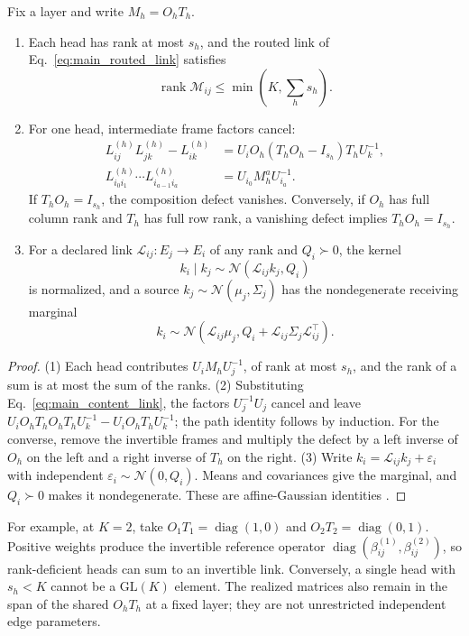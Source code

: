 \documentclass[twoside,11pt]{article}
\begin{document}
\begin{proposition}
\label{prop:link_algebra}
Fix a layer and write $M_h=O_hT_h$.
\begin{enumerate}
\item Each head has rank at most $s_h$, and the routed link of Eq.~\eqref{eq:main_routed_link} satisfies
\begin{equation}
\operatorname{rank}\mathcal M_{ij}
\le\min\left(K,\sum_hs_h\right).
\label{eq:main_link_rank}
\end{equation}
\item For one head, intermediate frame factors cancel:
\begin{align}
L_{ij}^{(h)}L_{jk}^{(h)}-L_{ik}^{(h)}
&=U_iO_h(T_hO_h-I_{s_h})T_hU_k^{-1},\\
L_{i_0i_1}^{(h)}\cdots L_{i_{a-1}i_a}^{(h)}
&=U_{i_0}M_h^aU_{i_a}^{-1}.
\label{eq:main_link_composition}
\end{align}
If $T_hO_h=I_{s_h}$, the composition defect vanishes. Conversely, if $O_h$ has full column rank and $T_h$ has full row rank, a vanishing defect implies $T_hO_h=I_{s_h}$.
\item For a declared link $\mathcal L_{ij}:E_j\to E_i$ of any rank and $Q_i\succ0$, the kernel
\begin{equation}
k_i\mid k_j\sim\mathcal N(\mathcal L_{ij}k_j,Q_i)
\label{eq:main_gaussian_link_kernel}
\end{equation}
is normalized, and a source $k_j\sim\mathcal N(\mu_j,\Sigma_j)$ has the nondegenerate receiving marginal
\begin{equation}
k_i\sim\mathcal N\left(
\mathcal L_{ij}\mu_j,
Q_i+\mathcal L_{ij}\Sigma_j\mathcal L_{ij}^{\top}\right).
\label{eq:main_gaussian_link_marginal}
\end{equation}
\end{enumerate}
\end{proposition}
\begin{proof}
(1) Each head contributes $U_iM_hU_j^{-1}$, of rank at most $s_h$, and the rank of a sum is at most the sum of the ranks. (2) Substituting Eq.~\eqref{eq:main_content_link}, the factors $U_j^{-1}U_j$ cancel and leave $U_iO_hT_hO_hT_hU_k^{-1}-U_iO_hT_hU_k^{-1}$; the path identity follows by induction. For the converse, remove the invertible frames and multiply the defect by a left inverse of $O_h$ on the left and a right inverse of $T_h$ on the right. (3) Write $k_i=\mathcal L_{ij}k_j+\varepsilon_i$ with independent $\varepsilon_i\sim\mathcal N(0,Q_i)$. Means and covariances give the marginal, and $Q_i\succ0$ makes it nondegenerate. These are affine-Gaussian identities \citep{Bishop2006}.
\end{proof}
For example, at $K=2$, take $O_1T_1=\operatorname{diag}(1,0)$ and $O_2T_2=\operatorname{diag}(0,1)$. Positive weights produce the invertible reference operator $\operatorname{diag}(\beta_{ij}^{(1)},\beta_{ij}^{(2)})$, so rank-deficient heads can sum to an invertible link. Conversely, a single head with $s_h<K$ cannot be a $\mathrm{GL}(K)$ element. The realized matrices also remain in the span of the shared $O_hT_h$ at a fixed layer; they are not unrestricted independent edge parameters.
\end{document}
